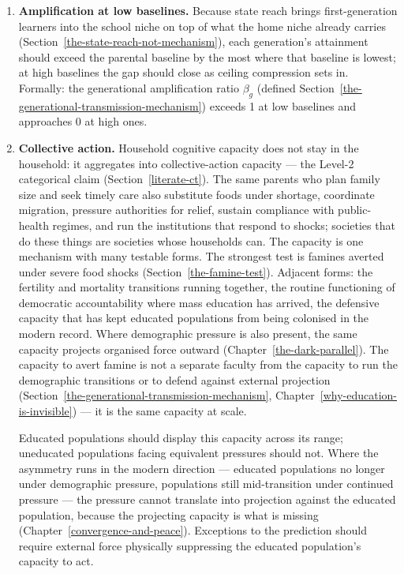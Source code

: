 \documentclass[12pt,letterpaper]{article}
\begin{document}
\begin{enumerate}
\item \textbf{Amplification at low baselines.} Because state reach
brings first-generation learners into the school niche on top of what
the home niche already carries
(Section~\ref{the-state-reach-not-mechanism}), each generation's
attainment should exceed the parental baseline by the most where that
baseline is lowest; at high baselines the gap should close as ceiling
compression sets in. Formally: the generational amplification ratio
$\beta_g$ (defined
Section~\ref{the-generational-transmission-mechanism}) exceeds 1 at low
baselines and approaches 0 at high ones.\label{pred:amplification}

\item \textbf{Collective action.} Household cognitive capacity does not
stay in the household: it aggregates into collective-action capacity
--- the Level-2 categorical claim (Section~\ref{literate-ct}).
The same parents who plan family size and seek timely care also
substitute foods under shortage, coordinate migration, pressure
authorities for relief, sustain compliance with public-health regimes,
and run the institutions that respond to shocks; societies that do
these things are societies whose households can. The capacity is one mechanism with many testable forms. The strongest
test is famines averted under severe food shocks
(Section~\ref{the-famine-test}). Adjacent forms: the fertility and
mortality transitions running together, the routine functioning of
democratic accountability where mass education has arrived, the
defensive capacity that has kept educated populations from being
colonised in the modern record. Where demographic pressure is also
present, the same capacity projects organised force outward
(Chapter~\ref{the-dark-parallel}). The capacity to avert
famine is not a separate faculty from the capacity to run the
demographic transitions or to defend against external projection
(Section~\ref{the-generational-transmission-mechanism},
Chapter~\ref{why-education-is-invisible}) --- it is the same capacity
at scale.

Educated populations should display this capacity across its
range; uneducated populations facing equivalent pressures should not.
Where the asymmetry runs in the modern direction --- educated
populations no longer under demographic pressure, populations still
mid-transition under continued pressure --- the pressure cannot
translate into projection against the educated population, because the
projecting capacity is what is missing
(Chapter~\ref{convergence-and-peace}). Exceptions to the prediction
should require external force physically suppressing the educated
population's capacity to act.\label{pred:collective-action}
\end{enumerate}
\end{document}

